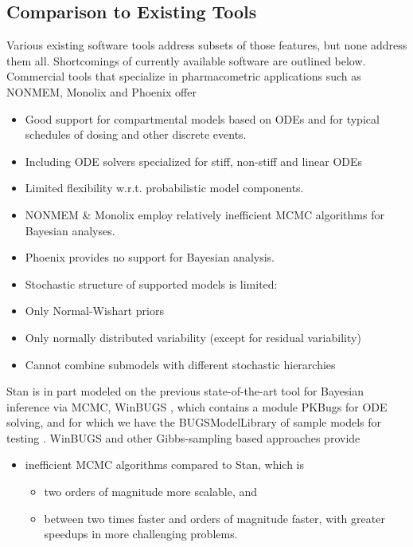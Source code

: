 \documentclass[11pt]{article}
\begin{document}
\subsection*{Comparison to Existing Tools}\label{existing}

Various existing software tools address subsets of those features, but
none address them all. Shortcomings of currently available software
are outlined below. Commercial tools that specialize in pharmacometric
applications such as NONMEM, Monolix and Phoenix offer

\begin{itemize}
\item Good support for compartmental models based on ODEs and for
  typical schedules of dosing and other discrete events.
\item Including ODE solvers specialized for stiff, non-stiff and
  linear ODEs
\item Limited flexibility w.r.t. probabilistic model components.
\item NONMEM \& Monolix employ relatively inefficient MCMC algorithms
  for Bayesian analyses.
\item Phoenix provides no support for Bayesian analysis.
\item Stochastic structure of supported models is limited:
\item Only Normal-Wishart priors
\item Only normally distributed variability (except for residual
  variability)
\item Cannot combine submodels with different stochastic hierarchies
\end{itemize}

Stan is in part modeled on the previous state-of-the-art tool for
Bayesian inference via MCMC, WinBUGS \citep{lunn-et-al:2000}, which
contains a module PKBugs for ODE solving, and for which we have the
BUGSModelLibrary of sample models for testing
\citep{gastonguay-et-al:2010}.  WinBUGS and other Gibbs-sampling based
approaches provide

\begin{itemize}
\item inefficient MCMC algorithms compared to Stan, which is
\begin{itemize}
\item  two orders of magnitude more scalable, and
\item  between two times faster and orders of magnitude faster,
  with greater speedups in more challenging problems.
\end{itemize}
\end{itemize}
\end{document}

